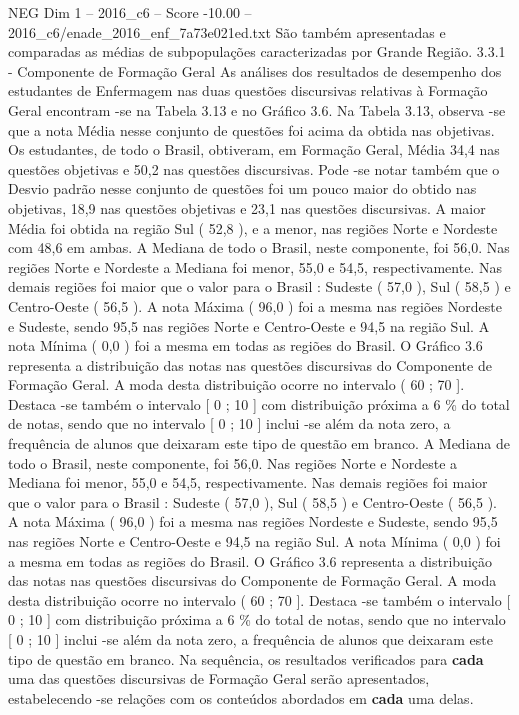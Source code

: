 \begin{textsample}{NEG Dim 1 – 2016\_c6 – Score -10.00 – 2016\_c6/enade\_2016\_enf\_7a73e021ed.txt}
São também apresentadas e comparadas as médias de subpopulações caracterizadas por Grande Região. 3.3.1 - Componente de Formação Geral As análises dos resultados de desempenho dos estudantes de Enfermagem nas duas questões discursivas relativas à Formação Geral encontram -se na Tabela 3.13 e no Gráfico 3.6.
Na Tabela 3.13, observa -se que a nota Média nesse conjunto de questões foi acima da obtida nas objetivas.
Os estudantes, de todo o Brasil, obtiveram, em Formação Geral, Média 34,4 nas questões objetivas e 50,2 nas questões discursivas.
Pode -se notar também que o Desvio padrão nesse conjunto de questões foi um pouco maior do obtido nas objetivas, 18,9 nas questões objetivas e 23,1 nas questões discursivas.
A maior Média foi obtida na região Sul ( 52,8 ), e a menor, nas regiões Norte e Nordeste com 48,6 em ambas.
A Mediana de todo o Brasil, neste componente, foi 56,0.
Nas regiões Norte e Nordeste a Mediana foi menor, 55,0 e 54,5, respectivamente.
Nas demais regiões foi maior que o valor para o Brasil : Sudeste ( 57,0 ), Sul ( 58,5 ) e Centro-Oeste ( 56,5 ).
A nota Máxima ( 96,0 ) foi a mesma nas regiões Nordeste e Sudeste, sendo 95,5 nas regiões Norte e Centro-Oeste e 94,5 na região Sul.
A nota Mínima ( 0,0 ) foi a mesma em todas as regiões do Brasil.
O Gráfico 3.6 representa a distribuição das notas nas questões discursivas do Componente de Formação Geral.
A moda desta distribuição ocorre no intervalo ( 60 ; 70 ].
Destaca -se também o intervalo [ 0 ; 10 ] com distribuição próxima a 6 \% do total de notas, sendo que no intervalo [ 0 ; 10 ] inclui -se além da nota zero, a frequência de alunos que deixaram este tipo de questão em branco.
A Mediana de todo o Brasil, neste componente, foi 56,0.
Nas regiões Norte e Nordeste a Mediana foi menor, 55,0 e 54,5, respectivamente.
Nas demais regiões foi maior que o valor para o Brasil : Sudeste ( 57,0 ), Sul ( 58,5 ) e Centro-Oeste ( 56,5 ).
A nota Máxima ( 96,0 ) foi a mesma nas regiões Nordeste e Sudeste, sendo 95,5 nas regiões Norte e Centro-Oeste e 94,5 na região Sul.
A nota Mínima ( 0,0 ) foi a mesma em todas as regiões do Brasil.
O Gráfico 3.6 representa a distribuição das notas nas questões discursivas do Componente de Formação Geral.
A moda desta distribuição ocorre no intervalo ( 60 ; 70 ].
Destaca -se também o intervalo [ 0 ; 10 ] com distribuição próxima a 6 \% do total de notas, sendo que no intervalo [ 0 ; 10 ] inclui -se além da nota zero, a frequência de alunos que deixaram este tipo de questão em branco.
Na sequência, os resultados verificados para \textbf{cada} uma das questões discursivas de Formação Geral serão apresentados, estabelecendo -se relações com os conteúdos abordados em \textbf{cada} uma delas.

\end{textsample}
